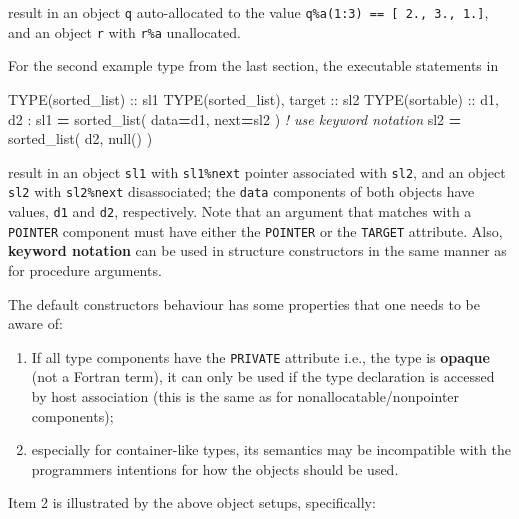 \documentclass[
]{scrartcl}
\newenvironment{Shaded}{}{}
\newcommand{\CommentTok}[1]{\textcolor[rgb]{0.38,0.63,0.69}{\textit{#1}}}
\newcommand{\DataTypeTok}[1]{\textcolor[rgb]{0.56,0.13,0.00}{#1}}
\newcommand{\KeywordTok}[1]{\textcolor[rgb]{0.00,0.44,0.13}{\textbf{#1}}}
\newcommand{\NormalTok}[1]{#1}
\providecommand{\tightlist}{%
  \setlength{\itemsep}{0pt}\setlength{\parskip}{0pt}}
\begin{document}
result in an object \texttt{q} auto-allocated to the value
\texttt{q\%a(1:3)\ ==\ {[}\ 2.,\ 3.,\ 1.{]}}, and an object \texttt{r}
with \texttt{r\%a} unallocated.

For the second example type from the last section, the executable
statements in

\begin{Shaded}
\begin{Highlighting}[]
\DataTypeTok{TYPE(sorted\_list)} \DataTypeTok{::}\NormalTok{ sl1}
\DataTypeTok{TYPE(sorted\_list)}\NormalTok{, }\DataTypeTok{target} \DataTypeTok{::}\NormalTok{ sl2}
\DataTypeTok{TYPE(sortable)} \DataTypeTok{::}\NormalTok{ d1, d2}
\NormalTok{:}
\NormalTok{sl1 }\KeywordTok{=}\NormalTok{ sorted\_list( data}\KeywordTok{=}\NormalTok{d1, next}\KeywordTok{=}\NormalTok{sl2 )  }\CommentTok{! use keyword notation}
\NormalTok{sl2 }\KeywordTok{=}\NormalTok{ sorted\_list( d2, null() )}
\end{Highlighting}
\end{Shaded}

result in an object \texttt{sl1} with \texttt{sl1\%next} pointer
associated with \texttt{sl2}, and an object \texttt{sl2} with
\texttt{sl2\%next} disassociated; the \texttt{data} components of both
objects have values, \texttt{d1} and \texttt{d2}, respectively. Note
that an argument that matches with a \texttt{POINTER} component must
have either the \texttt{POINTER} or the \texttt{TARGET} attribute. Also,
\textbf{keyword notation} can be used in structure constructors in the
same manner as for procedure arguments.

The default constructor\textquotesingle s behaviour has some properties
that one needs to be aware of:

\begin{enumerate}
\def\labelenumi{\arabic{enumi}.}
\tightlist
\item
  If all type components have the \texttt{PRIVATE} attribute i.e., the
  type is \textbf{opaque} (not a Fortran term), it can only be used if
  the type declaration is accessed by host association (this is the same
  as for nonallocatable/nonpointer components);
\item
  especially for container-like types, its semantics may be incompatible
  with the programmers intentions for how the objects should be used.
\end{enumerate}

Item 2 is illustrated by the above object setups, specifically:
\end{document}
